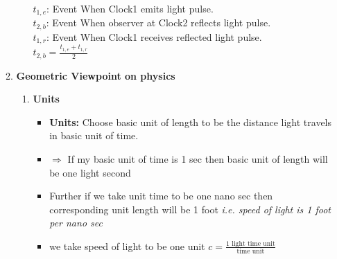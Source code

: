 \documentclass[11pt,a4paper]{article}
\begin{document}
\begin{enumerate}
\begin{enumerate}
\begin{enumerate}
\begin{figure}[H]
                                          \caption{} \label{Fig.1}
                                    \end{figure}
                                    $t_{1,e}$: Event When Clock1 emits light pulse.\\
                                    $t_{2,b}$: Event When observer at Clock2 reflects light pulse.\\
                                    $t_{1,r}$: Event When Clock1 receives reflected light pulse.\\
                                    $t_{2,b}=\displaystyle{\frac{t_{1,e}+t_{1,r}}{2}}$\\
                        \end{enumerate}
                  \item \textbf{\Large Geometric Viewpoint on physics}
                        \begin{enumerate}
                              \item \textbf{Units}
                                    \begin{itemize}
                                          \item \textbf{Units:} Choose basic unit of length to be the distance light travels in basic unit of time.
                                          \item $\Rightarrow$ If my basic unit of time is 1 sec then basic unit of length will be one light second
                                          \item Further if we take unit time to be one nano sec then corresponding unit length will be 1 foot \textit{i.e. speed of light is 1 foot per nano sec}
                                          \item we take speed of light to be one unit $c=\displaystyle{\frac{\text{1 light time unit}}{\text{time unit}}}$

\end{itemize}
\end{enumerate}
\end{enumerate}
\end{enumerate}
\end{document}
